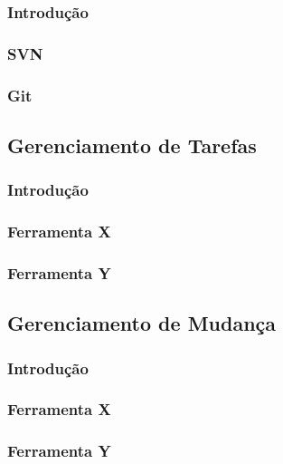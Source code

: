 \documentclass[12pt,a4paper]{article}
\begin{document}
		\subsubsection{Introdução}
		\subsubsection{SVN}
		\subsubsection{Git}
		
	\subsection{Gerenciamento de Tarefas}
		\subsubsection{Introdução}
		\subsubsection{Ferramenta X}
		\subsubsection{Ferramenta Y}
	
	\subsection{Gerenciamento de Mudança}
		\subsubsection{Introdução}
		\subsubsection{Ferramenta X}
		\subsubsection{Ferramenta Y}
		
		

\clearpage
\nocite{*}
		
		
\end{document}
